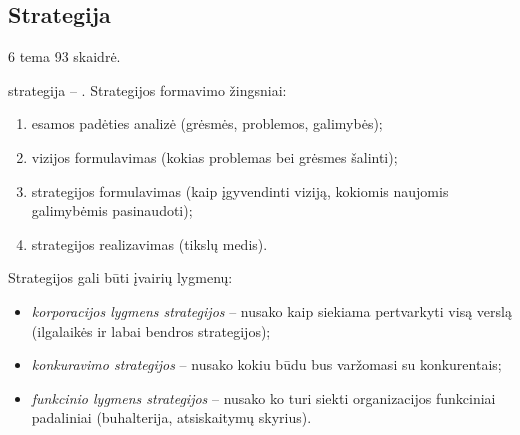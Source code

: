 \subsection{Strategija}

6 tema 93 skaidrė.

\Gls{strategija} – . Strategijos formavimo
žingsniai:
\begin{enumerate}
  \item esamos padėties analizė (grėsmės, problemos, galimybės);
  \item vizijos formulavimas (kokias problemas bei grėsmes šalinti);
  \item strategijos formulavimas (kaip įgyvendinti viziją, kokiomis
    naujomis galimybėmis pasinaudoti);
  \item strategijos realizavimas (tikslų medis).
\end{enumerate}

Strategijos gali būti įvairių lygmenų:
\begin{itemize}
  \item \emph{korporacijos lygmens strategijos} – nusako kaip siekiama
    pertvarkyti visą verslą (ilgalaikės ir labai bendros strategijos);
  \item \emph{konkuravimo strategijos} – nusako kokiu būdu bus varžomasi
    su konkurentais;
  \item \emph{funkcinio lygmens strategijos} – nusako ko turi siekti
    organizacijos funkciniai padaliniai (buhalterija, atsiskaitymų
    skyrius).
\end{itemize}

